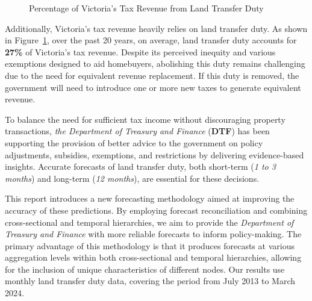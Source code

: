 \documentclass[
  11pt,
  a4paper,
]{article}
\begin{document}
\begin{figure}


\caption{\label{fig-taxrevenue}Percentage of Victoria's Tax Revenue from
Land Transfer Duty}

\end{figure}%

Additionally, Victoria's tax revenue heavily relies on land transfer
duty. As shown in Figure~\ref{fig-taxrevenue}, over the past 20 years,
on average, land transfer duty accounts for \textbf{27\%} of Victoria's
tax revenue. Despite its perceived inequity and various exemptions
designed to aid homebuyers, abolishing this duty remains challenging due
to the need for equivalent revenue replacement. If this duty is removed,
the government will need to introduce one or more new taxes to generate
equivalent revenue.

To balance the need for sufficient tax income without discouraging
property transactions, \emph{the Department of Treasury and Finance}
(\textbf{DTF}) has been supporting the provision of better advice to the
government on policy adjustments, subsidies, exemptions, and
restrictions by delivering evidence-based insights. Accurate forecasts
of land transfer duty, both short-term (\emph{1 to 3 months}) and
long-term (\emph{12 months}), are essential for these decisions.

This report introduces a new forecasting methodology aimed at improving
the accuracy of these predictions. By employing forecast reconciliation
and combining cross-sectional and temporal hierarchies, we aim to
provide the \emph{Department of Treasury and Finance} with more reliable
forecasts to inform policy-making. The primary advantage of this
methodology is that it produces forecasts at various aggregation levels
within both cross-sectional and temporal hierarchies, allowing for the
inclusion of unique characteristics of different nodes. Our results use
monthly land transfer duty data, covering the period from July 2013 to
March 2024.
\end{document}
